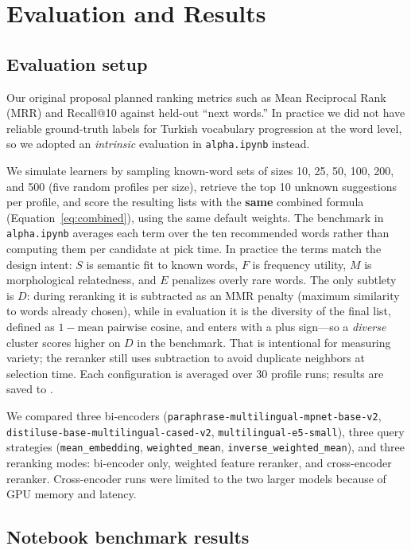 \documentclass{article}
\begin{document}
\section{Evaluation and Results}
\label{sec:eval}

\subsection{Evaluation setup}

Our original proposal planned ranking metrics such as Mean Reciprocal Rank (MRR) and Recall@10 against held-out ``next words.'' In practice we did not have reliable ground-truth labels for Turkish vocabulary progression at the word level, so we adopted an \textit{intrinsic} evaluation in \texttt{alpha.ipynb} instead.

We simulate learners by sampling known-word sets of sizes 10, 25, 50, 100, 200, and 500 (five random profiles per size), retrieve the top 10 unknown suggestions per profile, and score the resulting lists with the \textbf{same} combined formula (Equation~\eqref{eq:combined}), using the same default weights. The benchmark in \texttt{alpha.ipynb} averages each term over the ten recommended words rather than computing them per candidate at pick time. In practice the terms match the design intent: $S$ is semantic fit to known words, $F$ is frequency utility, $M$ is morphological relatedness, and $E$ penalizes overly rare words. The only subtlety is $D$: during reranking it is subtracted as an MMR penalty (maximum similarity to words already chosen), while in evaluation it is the diversity of the final list, defined as $1 - \text{mean pairwise cosine}$, and enters with a plus sign---so a \emph{diverse} cluster scores higher on $D$ in the benchmark. That is intentional for measuring variety; the reranker still uses subtraction to avoid duplicate neighbors at selection time. Each configuration is averaged over 30 profile runs; results are saved to .

We compared three bi-encoders (\texttt{paraphrase-multilingual-mpnet-base-v2}, \texttt{distiluse-base-multilingual-cased-v2}, \texttt{multilingual-e5-small}), three query strategies (\texttt{mean\_embedding}, \texttt{weighted\_mean}, \texttt{inverse\_weighted\_mean}), and three reranking modes: bi-encoder only, weighted feature reranker, and cross-encoder reranker. Cross-encoder runs were limited to the two larger models because of GPU memory and latency.

\subsection{Notebook benchmark results}
\end{document}
